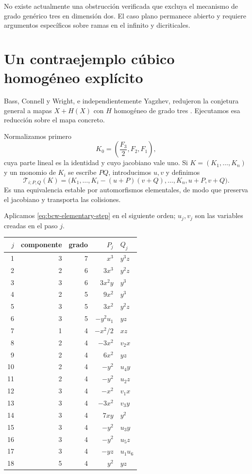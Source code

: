 \documentclass[11pt]{article}
\theoremstyle{definition}
\theoremstyle{remark}
\begin{document}
No existe actualmente una obstrucci\'on verificada que excluya el mecanismo de
grado gen\'erico tres en dimensi\'on dos. El caso plano permanece abierto y
requiere argumentos espec\'ificos sobre ramas en el infinito y dicriticales.

\section{Un contraejemplo c\'ubico homog\'eneo expl\'icito}
\label{sec:explicit-cubic}

Bass, Connell y Wright, e independientemente Yagzhev, redujeron la conjetura
general a mapas $X+H(X)$ con $H$ homog\'eneo de grado tres
\cite{Yagzhev1980,BassConnellWright1982}. Ejecutamos esa reducci\'on sobre el
mapa concreto.

Normalizamos primero
\begin{equation}\label{eq:normalized-original}
K_0=\left(\frac{F_3}{2},F_2,F_1\right),
\end{equation}
cuya parte lineal es la identidad y cuyo jacobiano vale uno. Si
$K=(K_1,\ldots,K_n)$ y un monomio de $K_i$ se escribe $PQ$, introducimos
$u,v$ y definimos
\begin{equation}\label{eq:bcw-elementary-step}
\mathcal T_{i;P,Q}(K)=
\bigl(K_1,\ldots,K_i-(u+P)(v+Q),\ldots,K_n,u+P,v+Q\bigr).
\end{equation}
Es una equivalencia estable por automorfismos elementales, de modo que
preserva el jacobiano y transporta las colisiones.

Aplicamos \eqref{eq:bcw-elementary-step} en el siguiente orden; $u_j,v_j$ son
las variables creadas en el paso $j$.

\begin{center}\small
\begin{tabular}{@{}rrrrl@{}}
\toprule
$j$&componente&grado&$P_j$&$Q_j$\\ \midrule
1&3&7&$x^3$&$y^3z$\\ 2&2&6&$3x^3$&$y^2z$\\
3&3&6&$3x^2y$&$y^3$\\ 4&2&5&$9x^2$&$y^3$\\
5&3&5&$3x^2$&$y^2z$\\ 6&3&5&$-y^2u_1$&$yz$\\
7&1&4&$-x^2/2$&$xz$\\ 8&2&4&$-3x^2$&$v_2x$\\
9&2&4&$6x^2$&$yz$\\ 10&2&4&$-y^2$&$u_4y$\\
11&2&4&$-y^2$&$u_2z$\\ 12&3&4&$-x^2$&$v_1x$\\
13&3&4&$-3x^2$&$v_3y$\\ 14&3&4&$7xy$&$y^2$\\
15&3&4&$-y^2$&$u_3y$\\ 16&3&4&$-y^2$&$u_5z$\\
17&3&4&$-yz$&$u_1u_6$\\ 18&5&4&$y^2$&$yz$\\ \bottomrule
\end{tabular}\normalsize
\end{center}
\end{document}

